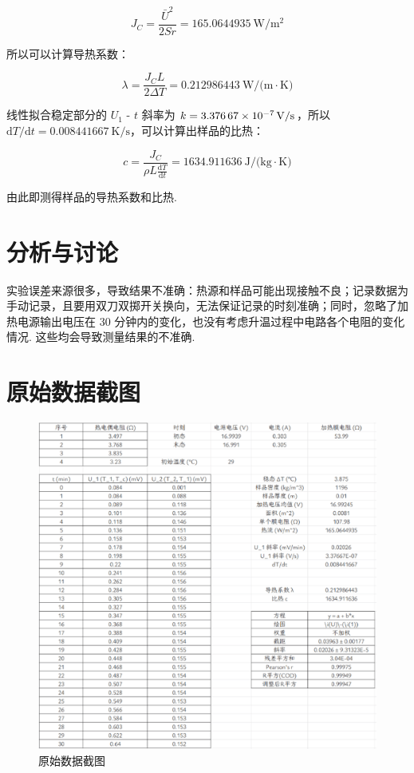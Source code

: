 \documentclass{customDoc}
\begin{document}
\begin{equation}
    J_C = \frac{\bar{U}^2}{2Sr} = \SI{165.0644935}{\watt/\metre^2}
\end{equation}

所以可以计算导热系数：

\begin{equation}
    \lambda = \frac{J_C L}{2\Delta T} = \SI{0.212986443}{\watt/(\metre\cdot\kelvin)}
\end{equation}

线性拟合稳定部分的 $U_1$ - $t$ 斜率为 $k = \SI{3.37667E-07}{\volt/\second}$，所以 $\text{d}T/\text{d}t = \SI{0.008441667}{\kelvin/\second}$，可以计算出样品的比热：

\begin{equation}
    c = \frac{J_C}{\rho L \frac{\text{d}T}{\text{d}t}} = \SI{1634.911636}{\joule/(\kilo\gram\cdot\kelvin)}
\end{equation}

由此即测得样品的导热系数和比热.

\section{分析与讨论}

实验误差来源很多，导致结果不准确：热源和样品可能出现接触不良；记录数据为手动记录，且要用双刀双掷开关换向，无法保证记录的时刻准确；同时，忽略了加热电源输出电压在 $30$ 分钟内的变化，也没有考虑升温过程中电路各个电阻的变化情况. 这些均会导致测量结果的不准确.

\section{原始数据截图}

\begin{figure}[H]
    \includegraphics[width=\textwidth]{originData.png}
    \caption{原始数据截图}
\end{figure}
\end{document}
